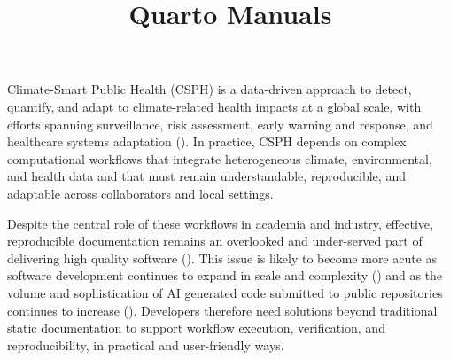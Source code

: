 \documentclass[
  man,
  floatsintext,
  longtable,
  nolmodern,
  notxfonts,
  notimes,
  12pt,
  colorlinks=true,linkcolor=blue,citecolor=blue,urlcolor=blue]{apa7}
\title{Quarto Manuals}
\newlength{\cslhangindent}
\newlength{\csllabelwidth}
\begin{document}
\maketitle




\setlength\LTleft{0pt}



\ifdefined\Shaded\renewenvironment{Shaded}{\begin{snugshade}\begin{singlespace}}{\end{singlespace}\end{snugshade}}\fi


\ifdefined\cslhangindent\else\newlength{\cslhangindent}\fi
\ifdefined\csllabelwidth\else\newlength{\csllabelwidth}\fi
\setlength{\cslhangindent}{0.5in}


Climate-Smart Public Health (CSPH) is a data-driven approach to detect,
quantify, and adapt to climate-related health impacts at a global scale,
with efforts spanning surveillance, risk assessment, early warning and
response, and healthcare systems adaptation
(). In practice, CSPH depends on complex computational workflows
that integrate heterogeneous climate, environmental, and health data and
that must remain understandable, reproducible, and adaptable across
collaborators and local settings.

Despite the central role of these workflows in academia and industry,
effective, reproducible documentation remains an overlooked and
under-served part of delivering high quality software
(). This issue is likely to become more acute as software
development continues to expand in scale and complexity
() and as the volume and sophistication of AI generated code
submitted to public repositories continues to increase
().
Developers therefore need solutions beyond traditional static
documentation to support workflow execution, verification, and
reproducibility, in practical and user-friendly ways.
\end{document}
